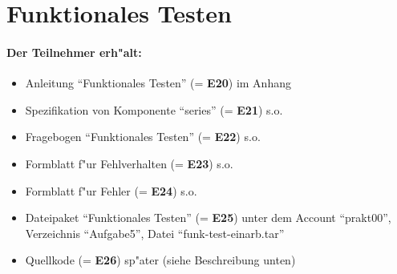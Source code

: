 \newpage
\section*{Funktionales Testen}

\paragraph{Der Teilnehmer erh"alt:}  
\begin{itemize}
	\item Anleitung "`Funktionales Testen"' (= {\bf E20}) im Anhang
	\item Spezifikation von Komponente "`series"' (= {\bf E21}) s.o.
	\item Fragebogen "`Funktionales Testen"' (= {\bf E22}) s.o.
	\item Formblatt f"ur Fehlverhalten (= {\bf E23}) s.o.
	\item Formblatt f"ur Fehler (= {\bf E24}) s.o.
	\item Dateipaket "`Funktionales Testen"' (= {\bf E25}) unter dem 
		Account "`prakt00"',
		Verzeichnis "`Aufgabe5"', Datei "`funk-test-einarb.tar"'
	\item Quellkode (= {\bf E26}) sp"ater (siehe Beschreibung unten)
\end{itemize}

